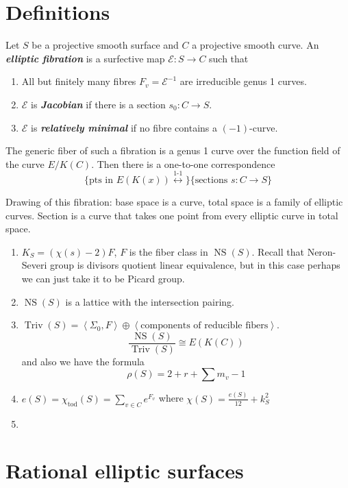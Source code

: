 \section{Definitions}

\begin{defn}
	Let $S$ be a projective smooth surface and $C$ a projective smooth curve. An \textit{\textbf{ elliptic fibration}} is a surfective map $\mathcal{E}:S\to C$ such that
	\begin{enumerate}[label=(\roman*)]
		\item All but finitely many fibres $F_{v}=\mathcal{E}^{-1}$ are irreducible genus 1 curves.
		\item $\mathcal{E}$ is \textit{\textbf{Jacobian}} if there is a section $s_0:C\to  S$.
		\item $\mathcal{E}$ is \textit{\textbf{relatively minimal}} if no fibre contains a $(-1)$-curve.
	\end{enumerate}
\end{defn}

The generic fiber of such a fibration is a genus 1 curve over the function field of the curve $E/K(C)$. Then there is a one-to-one correspondence
\[\{\text{pts in $E(K(x))$}\overset{\text{1-1} }{\longleftrightarrow }\} \{\text{sections $s:C\to S$} \}\]

Drawing of this fibration: base space is a curve, total space is a family of elliptic curves. Section is a curve that takes one point from every elliptic curve in total space.

\begin{enumerate}
	\item $K_S=(\chi(s)-2)F$,  $F$ is the fiber class in $\operatorname{NS}(S)$. Recall that Neron-Severi group is divisors quotient linear equivalence, but in this case perhaps we can just take it to be Picard group.
\item $\operatorname{NS}(S)$ is a lattice with the intersection pairing.
	\item $\operatorname{Triv}(S)=\left<\Sigma_0,F\right> \oplus \left<\text{components of reducible fibers} \right> $.
		\[\dfrac{\operatorname{NS}(S)}{\operatorname{Triv}(S)}\cong E(K(C))\]
		and also we have the formula
		\[\rho(S)=2+r+\sum m_v-1\]
	\item $e(S)=\chi_{\text{tod} }(S)=\sum_{v\in C}e^{F_v}$ where $\chi(S)=\frac{e(S)}{12}+k^2_S$
	\item 
\end{enumerate}

\section{Rational elliptic surfaces}

